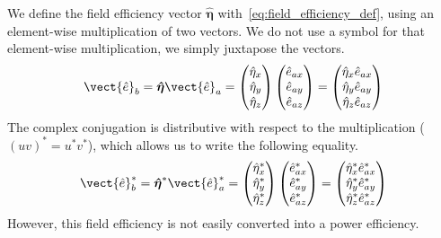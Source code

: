 We define the field efficiency vector $\hat{\boldsymbol\eta}$ with~\cref{eq:field_efficiency_def}, using an element-wise multiplication of two vectors.
We do not use a symbol for that element-wise multiplication, we simply juxtapose the vectors.
\begin{equation}
    \vect{\hat{e}}_b
    = \boldsymbol{\hat{\eta}} \vect{\hat{e}}_a
    =
    \begin{pmatrix}
        \hat{\eta}_x \\ \hat{\eta}_y \\ \hat{\eta}_z
    \end{pmatrix}
    \begin{pmatrix}
        \hat{e}_{ax} \\ \hat{e}_{ay} \\ \hat{e}_{az}
    \end{pmatrix}
    =
    \begin{pmatrix}
        \hat{\eta}_x \hat{e}_{ax} \\
        \hat{\eta}_y \hat{e}_{ay} \\
        \hat{\eta}_z \hat{e}_{az}
    \end{pmatrix}
    \label{eq:field_efficiency_def}
\end{equation}
The complex conjugation is distributive with respect to the multiplication ($(uv)^* = u^* v^*$), which allows us to write the following equality.
\begin{equation}
    \vect{\hat{e}}^*_b
    = \boldsymbol{\hat{\eta}}^* \vect{\hat{e}}^*_a
    =
    \begin{pmatrix}
        \hat{\eta}^*_x \\ \hat{\eta}^*_y \\ \hat{\eta}^*_z
    \end{pmatrix}
    \begin{pmatrix}
        \hat{e}^*_{ax} \\ \hat{e}^*_{ay} \\ \hat{e}^*_{az}
    \end{pmatrix}
    =
    \begin{pmatrix}
        \hat{\eta}^*_x \hat{e}^*_{ax} \\
        \hat{\eta}^*_y \hat{e}^*_{ay} \\
        \hat{\eta}^*_z \hat{e}^*_{az}
    \end{pmatrix}
    \label{eq:field_efficiency_conj}
\end{equation}
However, this field efficiency is not easily converted into a power efficiency.
